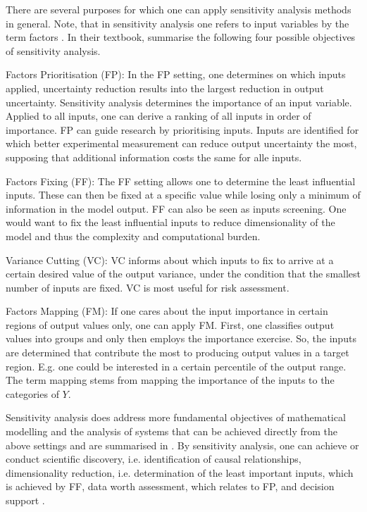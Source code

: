 There are several purposes for which one can apply sensitivity analysis methods in general. Note, that in sensitivity analysis one refers to input variables by the term factors \citep{R21}. In their textbook, \citet{STC04} summarise the following four possible objectives of sensitivity analysis.

Factors Prioritisation (FP): In the FP setting, one determines on which inputs applied, uncertainty reduction results into the largest reduction in output uncertainty. Sensitivity analysis determines the importance of an input variable. Applied to all inputs, one can derive a ranking of all inputs in order of importance. FP can guide research by prioritising inputs. Inputs are identified for which better experimental measurement can reduce output uncertainty the most, supposing that additional information costs the same for alle inputs.

Factors Fixing (FF): The FF setting allows one to determine the least influential inputs. These can then be fixed at a specific value while losing only a minimum of information in the model output. FF can also be seen as inputs screening. One would want to fix the least influential inputs to reduce dimensionality of the model and thus the complexity and computational burden.

Variance Cutting (VC): VC informs about which inputs to fix to arrive at a certain desired value of the output variance, under the condition that the smallest number of inputs are fixed. VC is most useful for risk assessment.

Factors Mapping (FM): If one cares about the input importance in certain regions of output values only, one can apply FM. First, one classifies output values into groups and only then employs the importance exercise. So, the inputs are determined that contribute the most to producing output values in a target region. E.g. one could be interested in a certain percentile of the output range. The term mapping stems from mapping the importance of the inputs to the categories of $Y$.

Sensitivity analysis does address more fundamental objectives of mathematical modelling and the analysis of systems that can be achieved directly from the above settings and are summarised in \citet{R21}. By sensitivity analysis, one can achieve or conduct scientific discovery, i.e. identification of causal relationships, dimensionality reduction, i.e. determination of the least important inputs, which is achieved by FF, data worth assessment, which relates to FP, and decision support \citep{R21}.

